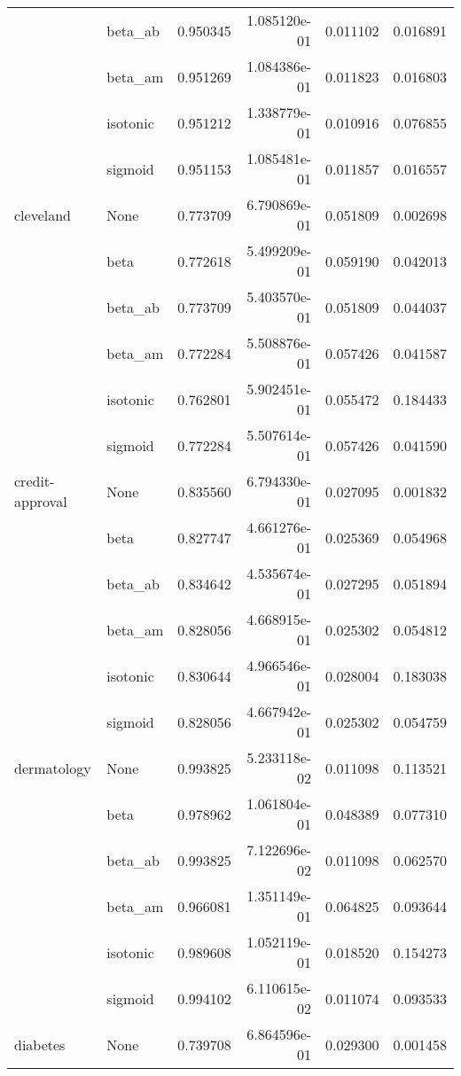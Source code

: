 \begin{tabular}{llrrrr}
        & beta\_ab &  0.950345 &  1.085120e-01 &  0.011102 &  0.016891 \\
        & beta\_am &  0.951269 &  1.084386e-01 &  0.011823 &  0.016803 \\
        & isotonic &  0.951212 &  1.338779e-01 &  0.010916 &  0.076855 \\
        & sigmoid &  0.951153 &  1.085481e-01 &  0.011857 &  0.016557 \\
cleveland & None &  0.773709 &  6.790869e-01 &  0.051809 &  0.002698 \\
        & beta &  0.772618 &  5.499209e-01 &  0.059190 &  0.042013 \\
        & beta\_ab &  0.773709 &  5.403570e-01 &  0.051809 &  0.044037 \\
        & beta\_am &  0.772284 &  5.508876e-01 &  0.057426 &  0.041587 \\
        & isotonic &  0.762801 &  5.902451e-01 &  0.055472 &  0.184433 \\
        & sigmoid &  0.772284 &  5.507614e-01 &  0.057426 &  0.041590 \\
credit-approval & None &  0.835560 &  6.794330e-01 &  0.027095 &  0.001832 \\
        & beta &  0.827747 &  4.661276e-01 &  0.025369 &  0.054968 \\
        & beta\_ab &  0.834642 &  4.535674e-01 &  0.027295 &  0.051894 \\
        & beta\_am &  0.828056 &  4.668915e-01 &  0.025302 &  0.054812 \\
        & isotonic &  0.830644 &  4.966546e-01 &  0.028004 &  0.183038 \\
        & sigmoid &  0.828056 &  4.667942e-01 &  0.025302 &  0.054759 \\
dermatology & None &  0.993825 &  5.233118e-02 &  0.011098 &  0.113521 \\
        & beta &  0.978962 &  1.061804e-01 &  0.048389 &  0.077310 \\
        & beta\_ab &  0.993825 &  7.122696e-02 &  0.011098 &  0.062570 \\
        & beta\_am &  0.966081 &  1.351149e-01 &  0.064825 &  0.093644 \\
        & isotonic &  0.989608 &  1.052119e-01 &  0.018520 &  0.154273 \\
        & sigmoid &  0.994102 &  6.110615e-02 &  0.011074 &  0.093533 \\
diabetes & None &  0.739708 &  6.864596e-01 &  0.029300 &  0.001458 \\

\end{tabular}
